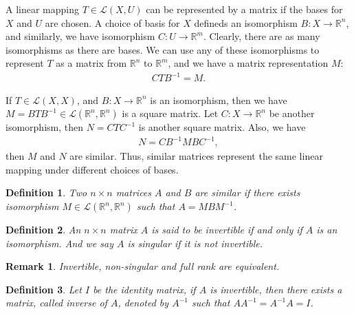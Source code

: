 \documentclass[10pt]{book}
\newtheorem{definition}{Definition}[chapter]
\newtheorem{remark}{Remark}[chapter]
\theoremstyle{definition}
\numberwithin{equation}{chapter}
\begin{document}
\medskip

A linear mapping $T\in\mathscr{L}(X,U)$ can be represented by a matrix if the bases for $X$ and $U$ are chosen. A choice of basis for $X$ defineds an isomorphism $B:X\to\mathbb{R}^n$, and similarly, we have isomorphism $C: U\to\mathbb{R}^m$. Clearly, there are as many isomorphisms as there are bases. We can use any of these isomorphisms to represent $T$ as a matrix from $\mathbb{R}^n$ to $\mathbb{R}^m$, and we have a matrix representation $M$:
\begin{align*}
    CTB^{-1} = M.
\end{align*}

If $T\in\mathscr{L}(X,X)$, and $B:X\to\mathbb{R}^n$ is an isomorphism, then we have $M = BTB^{-1}\in\mathscr{L}(\mathbb{R}^n,\mathbb{R}^n)$ is a square matrix. Let $C:X\to\mathbb{R}^n$ be another isomorphism, then $N = CTC^{-1}$ is another square matrix. Also, we have 
\begin{align*}
    N = C B^{-1} M B C^{-1},
\end{align*}
then $M$ and $N$ are similar. Thus, similar matrices represent the same linear mapping under different choices of bases.

\medskip

\begin{definition}
Two $n\times n$ matrices $A$ and $B$ are similar if there exists isomorphism $M\in\mathscr{L}(\mathbb{R}^n,\mathbb{R}^n)$ such that $A = MBM^{-1}$.
\end{definition}

\medskip

\begin{definition}
An $n\times n$ matrix $A$ is said to be invertible if and only if $A$ is an isomorphism. And we say $A$ is singular if it is not invertible.
\end{definition}
\begin{remark}
Invertible, non-singular and full rank are equivalent.
\end{remark}

\medskip

\begin{definition}
Let $I$ be the identity matrix, if $A$ is invertible, then there exists a matrix, called inverse of $A$, denoted by $A^{-1}$ such that $AA^{-1} = A^{-1}A = I$.
\end{definition}

\medskip



\medskip
\end{document}
